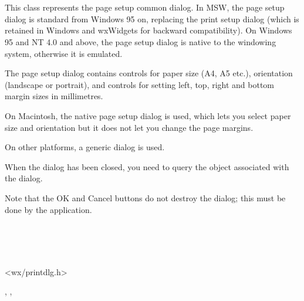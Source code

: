 \section{}\label{wxpagesetupdialog}

This class represents the page setup common dialog. In MSW, the page setup
dialog is standard from Windows 95 on, replacing the print setup dialog (which
is retained in Windows and wxWidgets for backward compatibility). On Windows 95
and NT 4.0 and above, the page setup dialog is native to the windowing system,
otherwise it is emulated.

The page setup dialog contains controls for paper size (A4, A5 etc.),
orientation (landscape or portrait), and controls for setting left, top, right
and bottom margin sizes in millimetres.

On Macintosh, the native page setup dialog is used, which lets you select paper
size and orientation but it does not let you change the page margins.

On other platforms, a generic dialog is used.

When the dialog has been closed, you need to query the
 object associated with
the dialog.

Note that the OK and Cancel buttons do not destroy the dialog; this must be done
by the application.


\\
\\
\\


<wx/printdlg.h>




, 
, 


\label{wxpagesetupdialogctor}


